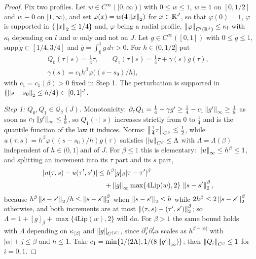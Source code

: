 \begin{proof}
Fix two profiles. Let $w\in C^\infty([0,\infty))$ with $0\le w\le1$, $w\equiv1$ on $[0,1/2]$ and $w\equiv0$ on $[1,\infty)$, and set $\varphi(x)=w(4\left\|x\right\|_2)$ for $x\in\mathbb{R}^J$, so that $\varphi(0)=1$, $\varphi$ is supported in $\{\left\|x\right\|_2\le1/4\}$ and, $\varphi$ being a radial profile, $\left\|\varphi\right\|_{C^l(\mathbb{R}^J)}\le\kappa_l$ with $\kappa_l$ depending on $l$ and $w$ only and not on $J$. Let $g\in C^\infty([0,1])$ with $0\le g\le1$, $\mathrm{supp}\,g\subset[1/4,3/4]$ and $\bar g=\int_0^1g\,d\tau>0$. For $h\in(0,1/2]$ put
\[
\begin{gathered}
Q_0(\tau\mid s)=\tfrac14\tau,\qquad Q_1(\tau\mid s)=\tfrac14\tau+\gamma(s)g(\tau),\\
\gamma(s)=c_1h^\beta\varphi\big((s-s_0)/h\big),
\end{gathered}
\]
with $c_1=c_1(\beta)>0$ fixed in Step 1. The perturbation is supported in $\{\left\|s-s_0\right\|_2\le h/4\}\subset[0,1]^J$.

\emph{Step 1: $Q_0,Q_1\in\mathcal Q_\beta(J)$.} Monotonicity: $\partial_\tau Q_1=\frac14+\gamma g'\ge\frac14-c_1\left\|g'\right\|_\infty\ge\frac18$ as soon as $c_1\left\|g'\right\|_\infty\le\frac18$, so $Q_1(\cdot\mid s)$ increases strictly from $0$ to $\frac14$ and is the quantile function of the law it induces. Norms: $\left\|\frac14\tau\right\|_{C^\beta}\le\frac12$, while $u(\tau,s)=h^\beta\varphi((s-s_0)/h)g(\tau)$ satisfies $\left\|u\right\|_{C^\beta}\le\Lambda$ with $\Lambda=\Lambda(\beta)$ independent of $h\in(0,1]$ and of $J$. For $\beta\le1$ this is elementary: $\left\|u\right\|_\infty\le h^\beta\le1$, and splitting an increment into its $\tau$ part and its $s$ part,
\[
\begin{aligned}
|u(\tau,s)-u(\tau',s')|&\le h^\beta[g]_\beta|\tau-\tau'|^\beta\\
&\quad+\left\|g\right\|_\infty\max\{4\mathrm{Lip}(w),2\}\,\left\|s-s'\right\|_2^\beta ,
\end{aligned}
\]
because $h^\beta\left\|s-s'\right\|_2/h\le\left\|s-s'\right\|_2^\beta$ when $\left\|s-s'\right\|_2\le h$ while $2h^\beta\le2\left\|s-s'\right\|_2^\beta$ otherwise, and both increments are at most $\left\|(\tau,s)-(\tau',s')\right\|_2^\beta$; so $\Lambda=1+[g]_\beta+\max\{4\mathrm{Lip}(w),2\}$ will do. For $\beta>1$ the same bound holds with $\Lambda$ depending on $\kappa_{\lceil\beta\rceil}$ and $\left\|g\right\|_{C^{\lceil\beta\rceil}}$, since $\partial^\alpha_s\partial^j_\tau u$ scales as $h^{\beta-|\alpha|}$ with $|\alpha|+j\le\beta$ and $h\le1$. Take $c_1=\min\{1/(2\Lambda),1/(8\left\|g'\right\|_\infty)\}$; then $\left\|Q_i\right\|_{C^\beta}\le1$ for $i=0,1$.


\end{proof}

